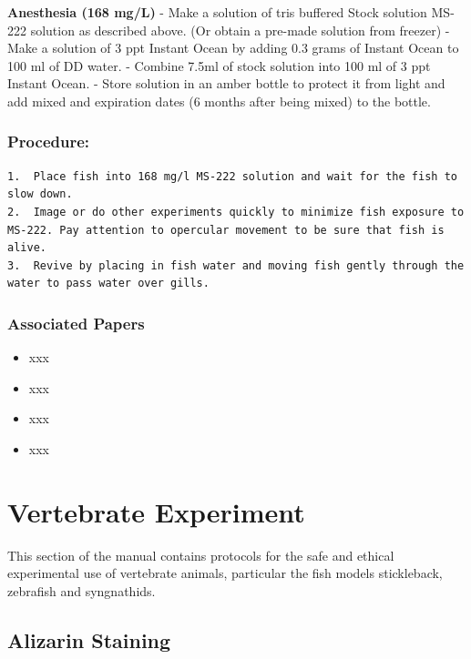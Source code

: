 \documentclass[
  letterpaper,
  DIV=11,
  numbers=noendperiod]{scrreprt}
\providecommand{\tightlist}{%
  \setlength{\itemsep}{0pt}\setlength{\parskip}{0pt}}\usepackage{longtable,booktabs,array}
\begin{document}
\textbf{Anesthesia (168 mg/L)} - Make a solution of tris buffered Stock
solution MS-222 solution as described above. (Or obtain a pre-made
solution from freezer) - Make a solution of 3 ppt Instant Ocean by
adding 0.3 grams of Instant Ocean to 100 ml of DD water. - Combine 7.5ml
of stock solution into 100 ml of 3 ppt Instant Ocean. - Store solution
in an amber bottle to protect it from light and add mixed and expiration
dates (6 months after being mixed) to the bottle.

\hypertarget{procedure-59}{%
\section{Procedure:}\label{procedure-59}}

\begin{verbatim}
1.  Place fish into 168 mg/l MS-222 solution and wait for the fish to slow down.
2.  Image or do other experiments quickly to minimize fish exposure to MS-222. Pay attention to opercular movement to be sure that fish is alive.
3.  Revive by placing in fish water and moving fish gently through the water to pass water over gills.
\end{verbatim}

\hypertarget{associated-papers-39}{%
\section{Associated Papers}\label{associated-papers-39}}

\begin{itemize}
\tightlist
\item
  xxx
\item
  xxx
\item
  xxx
\item
  xxx
\end{itemize}

\part{Vertebrate Experiment}

This section of the manual contains protocols for the safe and ethical
experimental use of vertebrate animals, particular the fish models
stickleback, zebrafish and syngnathids.

\hypertarget{sec-vert_exp-Alizarin}{%
\chapter{Alizarin Staining}\label{sec-vert_exp-Alizarin}}
\end{document}
